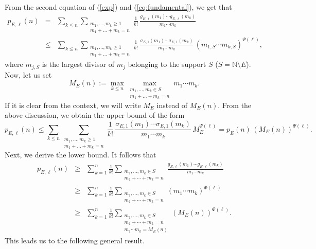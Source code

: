 \documentclass[12pt]{amsart}
\theoremstyle{definition}
\theoremstyle{remark}
\numberwithin{theorem}{section} \numberwithin{equation}{section}
\begin{document}



From the second equation of (\ref{exp}) and (\ref{eq:fundamental}), we get that
\begin{eqnarray*}
p_{E,\ell }\left( n\right) & =  & 
\sum _{k\leq n}\sum _{\substack{m_{1},\ldots ,m_{k} \geq 1 \\ m_{1}+\ldots +m_{k}=n}}
\frac{1}{k!} \, \frac{g_{E,\ell }\left( m_{1}\right) 
\cdots g_{E,\ell }\left( m_{k}\right) }{m_{1}\cdots m_{k}} \\
&\leq &
\sum _{k\leq n}\sum _{\substack{m_{1},\ldots ,m_{k} \geq 1 \\ m_{1}+\ldots +m_{k}=n}}
\frac{1}{k!} \, 
\frac{\sigma_{E,1}\left( m_{1}\right) 
\cdots \sigma_{E,1}\left( m_{k}\right) }{m_{1}\cdots m_{k}}
\, \left(m_{1,S} \cdots m_{k,S}\right)^{\Psi(\ell)},
\end{eqnarray*}
where $m_{j,S}$ is the largest divisor of $m_j$ belonging to the support $S$
($S=\mathbb{N}\setminus E$). Now, let us set
\begin{equation*}\label{max:M E}
M_{E}\left( n\right) :=\max _{k\leq n}
\max _{\substack{m_1,\ldots,m_k \in S \\ m_{1}+\ldots +m_{k}=n}}m_{1}\cdots m_{k}.
\end{equation*}
If it is clear from the context, we will write $M_E$ instead of $M_E(n)$. From the above discussion, we obtain the upper bound of the form
\begin{equation*}
p_{E,\ell }(n) \leq 
\sum _{k\leq n}\sum _{\substack{m_{1},\ldots ,m_{k} \geq 1 \\ m_{1}+\ldots +m_{k}=n}}
\frac{1}{k!} \, 
\frac{\sigma_{E,1}\left( m_{1}\right) 
\cdots \sigma_{E,1}\left( m_{k}\right) }{m_{1}\cdots m_{k}}
\, M_{E}^{\Psi(\ell)} = p_E(n) \, \left(M_E(n)\right)^{\Psi(\ell)}.
\label{pupper}
\end{equation*}
Next, we derive the lower bound. It follows that
\begin{eqnarray*}
p_{E,\ell }(n) &\geq& 
\sum_{k=1}^n \frac{1}{k!}
\sum_{\substack{m_1,\ldots,m_k\in S\\ m_1+\cdots+m_k=n}}
\frac{g_{E,\ell }(m_1)\cdots g_{E,\ell }(m_k)}{m_1\cdots m_k} \nonumber \\
&\geq &
\sum_{k=1}^n \frac{1}{k!}
\sum_{\substack{m_1,\ldots,m_k\in S\\ m_1+\cdots+m_k=n}}
\left(m_1 \cdots m_k\right)^{\Phi(\ell)} \nonumber \\
&\geq& \sum_{k=1}^n\frac{1}{k!}\sum_{\substack{m_1,\ldots,m_k\in S \\
m_1+\cdots+m_k=n \\ m_1\cdots m_k=M_{E}(n)}}\left(M_E(n)\right)^{\Phi(\ell)}.
\label{plower}
\end{eqnarray*}
This leads us to the following general result.
\end{document}
